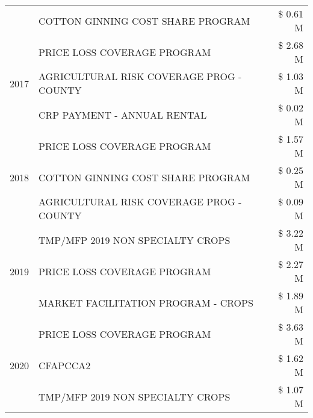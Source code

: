 \begin{tabular}{llr}
 & COTTON GINNING COST SHARE PROGRAM & \$ 0.61 M \\
\cline{1-3}
\multirow[t]{3}{*}{2017} & PRICE LOSS COVERAGE PROGRAM & \$ 2.68 M \\
 & AGRICULTURAL RISK COVERAGE PROG - COUNTY & \$ 1.03 M \\
 & CRP PAYMENT - ANNUAL RENTAL & \$ 0.02 M \\
\cline{1-3}
\multirow[t]{3}{*}{2018} & PRICE LOSS COVERAGE PROGRAM & \$ 1.57 M \\
 & COTTON GINNING COST SHARE PROGRAM & \$ 0.25 M \\
 & AGRICULTURAL RISK COVERAGE PROG - COUNTY & \$ 0.09 M \\
\cline{1-3}
\multirow[t]{3}{*}{2019} & TMP/MFP 2019 NON SPECIALTY CROPS & \$ 3.22 M \\
 & PRICE LOSS COVERAGE PROGRAM & \$ 2.27 M \\
 & MARKET FACILITATION PROGRAM - CROPS & \$ 1.89 M \\
\cline{1-3}
\multirow[t]{3}{*}{2020} & PRICE LOSS COVERAGE PROGRAM & \$ 3.63 M \\
 & CFAPCCA2 & \$ 1.62 M \\
 & TMP/MFP 2019 NON SPECIALTY CROPS & \$ 1.07 M \\
\cline{1-3}
\bottomrule
\end{tabular}
